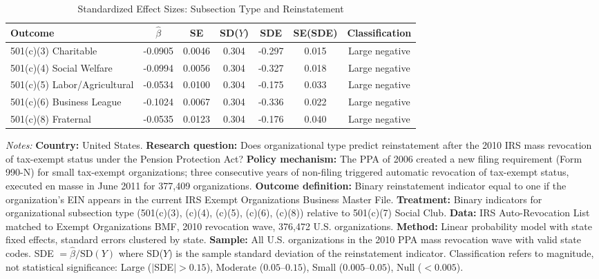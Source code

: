 \begin{table}[htbp]
\centering
\caption{Standardized Effect Sizes: Subsection Type and Reinstatement}
\label{tab:sde}
\begin{adjustbox}{max width=\textwidth}
\begin{tabular}{lcccccc}
\toprule
Outcome & $\hat{\beta}$ & SE & SD($Y$) & SDE & SE(SDE) & Classification \\
\midrule
501(c)(3) Charitable & -0.0905 & 0.0046 & 0.304 & -0.297 & 0.015 & Large negative \\
501(c)(4) Social Welfare & -0.0994 & 0.0056 & 0.304 & -0.327 & 0.018 & Large negative \\
501(c)(5) Labor/Agricultural & -0.0534 & 0.0100 & 0.304 & -0.175 & 0.033 & Large negative \\
501(c)(6) Business League & -0.1024 & 0.0067 & 0.304 & -0.336 & 0.022 & Large negative \\
501(c)(8) Fraternal & -0.0535 & 0.0123 & 0.304 & -0.176 & 0.040 & Large negative \\
\bottomrule
\end{tabular}
\end{adjustbox}
\begin{tablenotes}
\item \textit{Notes:} \textbf{Country:} United States. \textbf{Research question:} Does organizational type predict reinstatement after the 2010 IRS mass revocation of tax-exempt status under the Pension Protection Act? \textbf{Policy mechanism:} The PPA of 2006 created a new filing requirement (Form 990-N) for small tax-exempt organizations; three consecutive years of non-filing triggered automatic revocation of tax-exempt status, executed en masse in June 2011 for 377,409 organizations. \textbf{Outcome definition:} Binary reinstatement indicator equal to one if the organization's EIN appears in the current IRS Exempt Organizations Business Master File. \textbf{Treatment:} Binary indicators for organizational subsection type (501(c)(3), (c)(4), (c)(5), (c)(6), (c)(8)) relative to 501(c)(7) Social Club. \textbf{Data:} IRS Auto-Revocation List matched to Exempt Organizations BMF, 2010 revocation wave, 376,472 U.S. organizations. \textbf{Method:} Linear probability model with state fixed effects, standard errors clustered by state. \textbf{Sample:} All U.S. organizations in the 2010 PPA mass revocation wave with valid state codes. SDE $= \hat{\beta} / \text{SD}(Y)$ where SD($Y$) is the sample standard deviation of the reinstatement indicator. Classification refers to magnitude, not statistical significance: Large ($|$SDE$| > 0.15$), Moderate ($0.05$--$0.15$), Small ($0.005$--$0.05$), Null ($< 0.005$).
\end{tablenotes}
\end{table}
